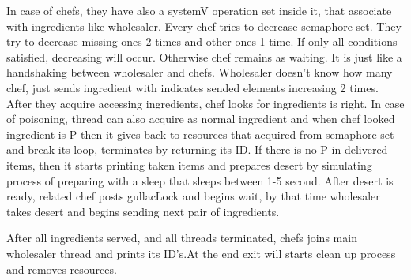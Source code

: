 \documentclass[twocolumn]{article}
\begin{document}
In case of chefs, they have also a systemV operation set inside it, that associate with ingredients like wholesaler. Every chef tries to decrease semaphore set. They try to decrease missing ones 2 times and other ones 1 time. If only all conditions satisfied, decreasing will occur. Otherwise chef remains as waiting. It is just like a handshaking between wholesaler and chefs. Wholesaler doesn't know how many chef, just sends ingredient with indicates sended elements increasing 2 times. After they acquire accessing ingredients, chef looks for ingredients is right. In case of poisoning, thread can also acquire as normal ingredient and when chef looked ingredient is P then it gives back to resources that acquired from semaphore set and break its loop, terminates by returning its ID. If there is no P in delivered items, then it starts printing taken items and prepares desert by simulating process of preparing with a sleep that sleeps between 1-5 second. After desert is ready, related chef posts gullacLock and begins wait, by that time wholesaler takes desert and begins sending next pair of ingredients. 

After all ingredients served, and all threads terminated, chefs joins main wholesaler thread and prints its ID's.At the end exit will starts clean up process and removes resources.
\end{document}
